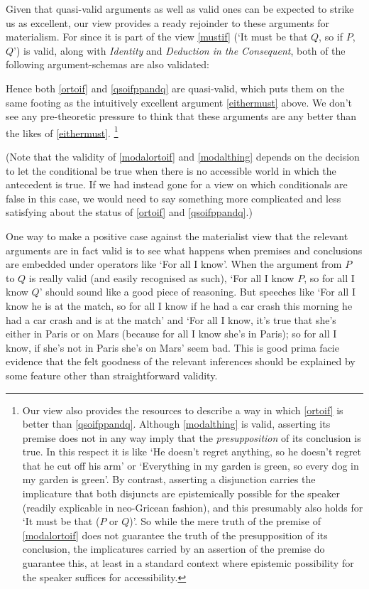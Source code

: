 \documentclass[If.tex]{subfiles}
\begin{document}
Given that quasi-valid arguments as well as valid ones can be expected to strike us as excellent, our view provides a ready rejoinder to these arguments for materialism. For since it is part of the view \ref{mustif} (‘It must be that $Q$, so if $P$, $Q$’) is valid, along with \emph{Identity} and \emph{Deduction in the Consequent}, both of the following argument-schemas are also validated:
\begin{prop}
	\litem[Modalised Or-to-if] \label{modalortoif}
	 \label{modalthing}
\end{prop}
Hence both \ref{ortoif} and \ref{qsoifppandq} are quasi-valid, which puts them on the same footing as the intuitively excellent argument \ref{eithermust} above. We don't see any pre-theoretic pressure to think that these arguments are any better than the likes of \ref{eithermust}.%
\footnote{Our view also provides the resources to describe a way in which \ref{ortoif} is better than \ref{qsoifppandq}.  Although \ref{modalthing} is valid, asserting its premise does not in any way imply that the \emph{presupposition} of its conclusion is true.  In this respect it is like ‘He doesn't regret anything, so he doesn't regret that he cut off his arm’ or ‘Everything in my garden is green, so every dog in my garden is green’.  By contrast, asserting a disjunction carries the implicature that both disjuncts are epistemically possible for the speaker (readily explicable in neo-Gricean fashion), and this presumably also holds for ‘It must be that ($P$ or $Q$)’.  So while the mere truth of the premise of \ref{modalortoif} does not guarantee the truth of the presupposition of its conclusion, the implicatures carried by an assertion of the premise do guarantee this, at least in a standard context where epistemic possibility for the speaker suffices for accessibility.}

(Note that the validity of \ref{modalortoif} and \ref{modalthing} depends on the decision to let the conditional be true when there is no accessible world in which the antecedent is true. If we had instead gone for a view on which conditionals are false in this case, we would need to say something more complicated and less satisfying about the status of \ref{ortoif} and \ref{qsoifppandq}.)

One way to make a positive case against the materialist view that the relevant arguments are in fact valid is to see what happens when premises and conclusions are embedded under operators like ‘For all I know’. When the argument from $P$ to $Q$ is really valid (and easily recognised as such), ‘For all I know $P$, so for all I know $Q$’ should sound like a good piece of reasoning. But speeches like ‘For all I know he is at the match, so for all I know if he had a car crash this morning he had a car crash and is at the match’ and ‘For all I know, it's true that she's either in Paris or on Mars (because for all I know she's in Paris); so for all I know, if she's not in Paris she's on Mars’ seem bad. This is good prima facie evidence that the felt goodness of the relevant inferences should be explained by some feature other than straightforward validity.
\end{document}
